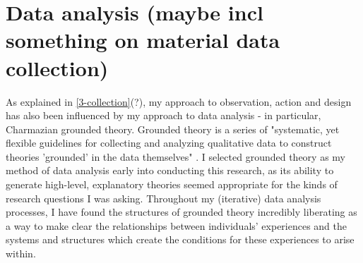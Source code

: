 












\section{Data analysis (maybe incl something on material data collection)}
\label{3-analysis}
As explained in \ref{3-collection}(?), my approach to observation, action and design has also been influenced by my approach to data analysis - in particular, Charmazian grounded theory. Grounded theory is a series of "systematic, yet flexible guidelines for collecting and analyzing qualitative data to construct theories 'grounded' in the data themselves" \cite[3]{charmaz_constructing_2006}. I selected grounded theory as my method of data analysis early into conducting this research, as its ability to generate high-level, explanatory theories seemed appropriate for the kinds of research questions I was asking. Throughout my (iterative) data analysis processes, I have found the structures of grounded theory incredibly liberating as a way to make clear the relationships between individuals' experiences and the systems and structures which create the conditions for these experiences to arise within. 

